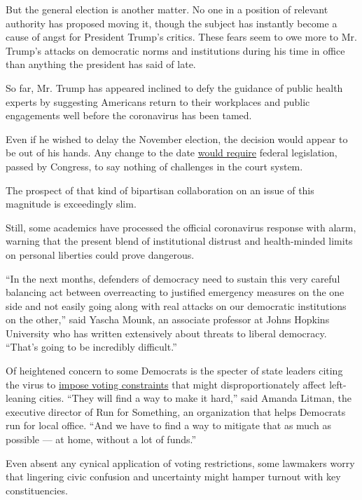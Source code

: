 But the general election is another matter. No one in a position of
relevant authority has proposed moving it, though the subject has
instantly become a cause of angst for President Trump's critics. These
fears seem to owe more to Mr. Trump's attacks on democratic norms and
institutions during his time in office than anything the president has
said of late.

So far, Mr. Trump has appeared inclined to defy the guidance of public
health experts by suggesting Americans return to their workplaces and
public engagements well before the coronavirus has been tamed.

Even if he wished to delay the November election, the decision would
appear to be out of his hands. Any change to the date
\href{https://www.nytimes3xbfgragh.onion/2020/03/14/us/politics/election-postponed-canceled.html}{would
require} federal legislation, passed by Congress, to say nothing of
challenges in the court system.

The prospect of that kind of bipartisan collaboration on an issue of
this magnitude is exceedingly slim.

Still, some academics have processed the official coronavirus response
with alarm, warning that the present blend of institutional distrust and
health-minded limits on personal liberties could prove dangerous.

``In the next months, defenders of democracy need to sustain this very
careful balancing act between overreacting to justified emergency
measures on the one side and not easily going along with real attacks on
our democratic institutions on the other,'' said Yascha Mounk, an
associate professor at Johns Hopkins University who has written
extensively about threats to liberal democracy. ``That's going to be
incredibly difficult.''

Of heightened concern to some Democrats is the specter of state leaders
citing the virus to
\href{https://www.thenation.com/article/politics/trump-stealing-election/}{impose
voting constraints} that might disproportionately affect left-leaning
cities. ``They will find a way to make it hard,'' said Amanda Litman,
the executive director of Run for Something, an organization that helps
Democrats run for local office. ``And we have to find a way to mitigate
that as much as possible --- at home, without a lot of funds.''

Even absent any cynical application of voting restrictions, some
lawmakers worry that lingering civic confusion and uncertainty might
hamper turnout with key constituencies.


